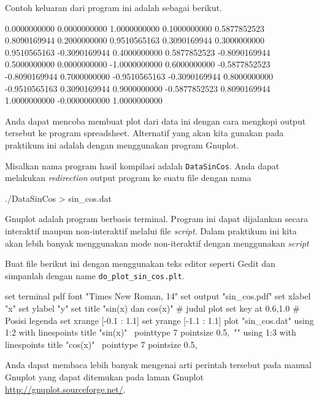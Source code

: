 \documentclass[a4paper,11pt]{extarticle}
\begin{document}
Contoh keluaran dari program ini adalah sebagai berikut.
\begin{textcode}
      0.0000000000       0.0000000000       1.0000000000
      0.1000000000       0.5877852523       0.8090169944
      0.2000000000       0.9510565163       0.3090169944
      0.3000000000       0.9510565163      -0.3090169944
      0.4000000000       0.5877852523      -0.8090169944
      0.5000000000       0.0000000000      -1.0000000000
      0.6000000000      -0.5877852523      -0.8090169944
      0.7000000000      -0.9510565163      -0.3090169944
      0.8000000000      -0.9510565163       0.3090169944
      0.9000000000      -0.5877852523       0.8090169944
      1.0000000000      -0.0000000000       1.0000000000
\end{textcode}

Anda dapat mencoba membuat plot dari data ini dengan cara mengkopi output tersebut
ke program spreadsheet.
Alternatif yang akan kita gunakan pada praktikum ini adalah dengan menggunakan
program \textsf{Gnuplot}.

Misalkan nama program hasil kompilasi adalah \texttt{DataSinCos}.
Anda dapat melakukan \textit{redirection} output program ke suatu file
dengan nama
\begin{textcode}
./DataSinCos > sin_cos.dat
\end{textcode}

\textsf{Gnuplot} adalah program berbasis terminal. Program ini dapat dijalankan
secara interaktif maupun non-interaktif melalui file \textit{script}.
Dalam praktikum ini kita
akan lebih banyak menggunakan mode non-iteraktif dengan menggunakan \textit{script}

Buat file berikut ini dengan menggunakan teks editor seperti \textsf{Gedit}
dan simpanlah dengan name \texttt{do\_plot\_sin\_cos.plt}.
\begin{gnuplotcode}
set terminal pdf font "Times New Roman, 14"
set output "sin_cos.pdf"
set xlabel "x"
set ylabel "y"
set title "sin(x) dan cos(x)" # judul plot
set key at 0.6,1.0 # Posisi legenda
set xrange [-0.1 : 1.1]
set yrange [-1.1 : 1.1]
plot "sin_cos.dat" using 1:2 with linespoints title "sin(x)" \
                   pointtype 7 pointsize 0.5,\
                "" using 1:3 with linespoints title "cos(x)" \
                   pointtype 7 pointsize 0.5,
\end{gnuplotcode}
Anda dapat membaca lebih banyak mengenai arti perintah tersebut pada
manual \textsf{Gnuplot} yang dapat ditemukan pada laman
\textsf{Gnuplot} \url{http://gnuplot.sourceforge.net/}.
\end{document}
